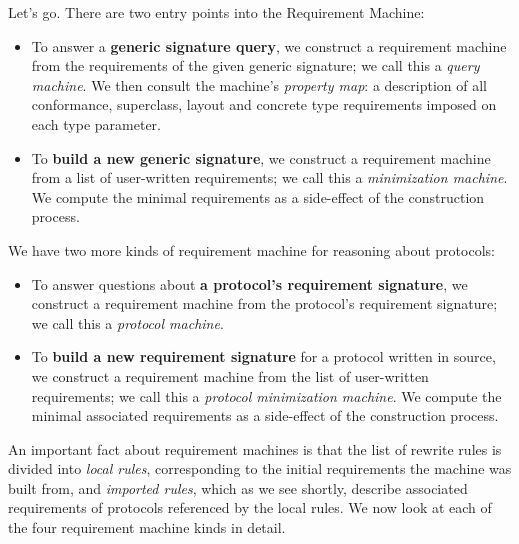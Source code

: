 \documentclass[../generics]{subfiles}
\begin{document}
Let's go. There are two entry points into the Requirement Machine:
\begin{itemize}
\item To answer a \textbf{generic signature query}, we construct a requirement machine from the requirements of the given generic signature; we call this a \emph{query machine}. We then consult the machine's \emph{property map}: a description of all conformance, superclass, layout and concrete type requirements imposed on each type parameter.

\item To \textbf{build a new generic signature}, we construct a requirement machine from a list of user-written requirements; we call this a \emph{minimization machine}. We compute the minimal requirements as a side-effect of the construction process.
\end{itemize}
We have two more kinds of requirement machine for reasoning about protocols:
\begin{itemize}
\item To answer questions about \textbf{a protocol's requirement signature}, we construct a requirement machine from the protocol's requirement signature; we call this a \emph{protocol machine}.
\item To \textbf{build a new requirement signature} for a protocol written in source, we construct a requirement machine from the list of user-written requirements; we call this a \emph{protocol minimization machine}. We compute the minimal associated requirements as a side-effect of the construction process.
\end{itemize}

An important fact about requirement machines is that the list of rewrite rules is divided into \emph{local rules}, corresponding to the initial requirements the machine was built from, and \emph{imported rules}, which as we see shortly, describe associated requirements of protocols referenced by the local rules. We now look at each of the four requirement machine kinds in detail.
\end{document}
